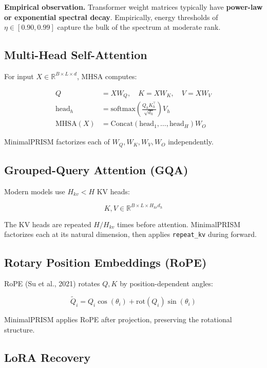 \textbf{Empirical observation.} Transformer weight matrices typically have 
\textbf{power-law or exponential spectral decay}. Empirically, energy thresholds 
of $\eta \in [0.90, 0.99]$ capture the bulk of the spectrum at moderate rank.

\subsection{Multi-Head Self-Attention}

For input $X \in \mathbb{R}^{B \times L \times d}$, MHSA computes:

\[
\begin{aligned}
Q &= X W_Q, \quad K = X W_K, \quad V = X W_V \\
\text{head}_h &= \text{softmax}\!\left(\frac{Q_h K_h^\top}{\sqrt{d_h}}\right) V_h \\
\text{MHSA}(X) &= \text{Concat}(\text{head}_1, \dots, \text{head}_H) W_O
\end{aligned}
\tag{3.7}
\]

MinimalPRISM factorizes each of $W_Q, W_K, W_V, W_O$ independently.

\subsection{Grouped-Query Attention (GQA)}

Modern models use $H_{kv} < H$ KV heads:

\[
K, V \in \mathbb{R}^{B \times L \times H_{kv} d_h}
\tag{3.8}
\]

The KV heads are repeated $H / H_{kv}$ times before attention. MinimalPRISM 
factorizes each at its natural dimension, then applies \texttt{repeat\_kv} during 
forward.

\subsection{Rotary Position Embeddings (RoPE)}

RoPE (Su et al., 2021) rotates $Q, K$ by position-dependent angles:

\[
\tilde{Q}_i = Q_i \cos(\theta_i) + \text{rot}(Q_i) \sin(\theta_i)
\tag{3.9}
\]

MinimalPRISM applies RoPE after projection, preserving the rotational 
structure.

\subsection{LoRA Recovery}

